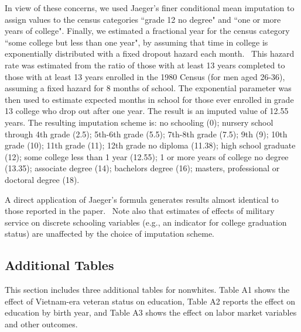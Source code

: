 \documentclass[12pt]{article}
\begin{document}
In view of these concerns, we used Jaeger's finer conditional mean
imputation to assign values to the census categories ``grade 12 no degree"
and ``one or more years of college". Finally, we estimated a fractional year
for the census category ``some college but less than one year", by assuming
that time in college is exponentially distributed with a fixed dropout
hazard each month. \ This hazard rate was estimated from the ratio of those
with at least 13 years completed to those with at least 13 years enrolled in
the 1980 Census (for men aged 26-36), assuming a fixed hazard for 8 months
of school. The exponential parameter was then used to estimate expected
months in school for those ever enrolled in grade 13 college who drop out
after one year. The result is an imputed value of 12.55 years. The resulting
imputation scheme is: no schooling (0); nursery school through 4th grade
(2.5); 5th-6th grade (5.5); 7th-8th grade (7.5); 9th (9); 10th grade (10);
11th grade (11); 12th grade no diploma (11.38); high school graduate (12);
some college less than 1 year (12.55); 1 or more years of college no degree
(13.35); associate degree (14); bachelors degree (16); masters, professional
or doctoral degree (18).

A direct application of Jaeger's formula generates results almost identical
to those reported in the paper. \ Note also that estimates of effects of
military service on discrete schooling variables (e.g., an indicator for
college graduation status) are unaffected by the choice of imputation scheme.

\subsection{Additional Tables}

This section includes three additional tables for nonwhites. Table A1 shows
the effect of Vietnam-era veteran status on education, Table A2 reports the
effect on education by birth year, and Table A3 shows the effect on labor
market variables and other outcomes.
\end{document}
